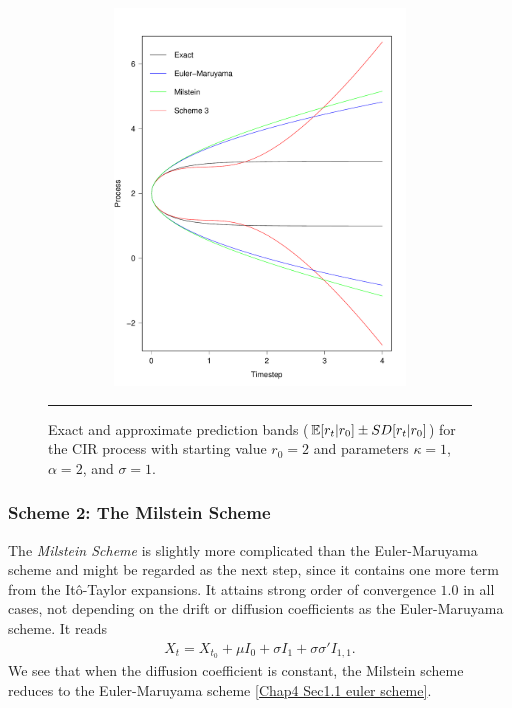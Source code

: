 \begin{figure}[htbp]
	\centering
	\includegraphics[width=13cm,height=10cm]{./Figures/discretizationError.pdf}
	\rule{35em}{0.5pt}
	\caption[Exact and approximate prediction bands for different discretization schemes]{Exact and approximate prediction bands ($\mathbb{E}[r_t|r_0]\pm SD[r_t|r_0]$) for the CIR process with starting value $r_0=2$ and parameters $\kappa=1$, $\alpha=2$, and $\sigma=1$.}
	\label{fig:discretizationError}
\end{figure}




\subsubsection{Scheme 2: The Milstein Scheme}

The \textit{Milstein Scheme} is slightly more complicated than the Euler-Maruyama scheme and might be regarded as the next step, since it contains one more term from the Itô-Taylor expansions.
It attains strong order of convergence $1.0$ in all cases, not depending on the drift or diffusion coefficients as the Euler-Maruyama scheme.
It reads
\begin{align}\label{Chap4 Sec1.2 Milstein scheme}
X_t=X_{t_0}+\mu I_0 + \sigma I_1 + \sigma\sigma'I_{1,1}.
\end{align}
We see that when the diffusion coefficient is constant, the Milstein scheme reduces to the Euler-Maruyama scheme \eqref{Chap4 Sec1.1 euler scheme}.


